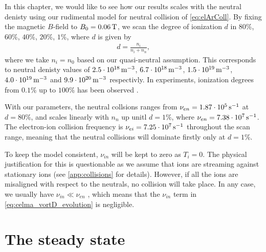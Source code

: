 In this chapter, we would like to see how our results scales with the neutral denisty using our rudimental model for neutral collision of \cref{eq:elArColl}.
By fixing the magnetic $B$-field to $B_0=0.06\, \text{T}$, we scan the degree of ionization $d$ in $80\%$, $60\%$, $40\%$, $20\%$, $1\%$, where $d$ is given by
%
\begin{align*}
    d = \frac{n_i}{n_i+n_n},
\end{align*}
%
where we take $n_i=n_0$ based on our quasi-neutral assumption.
This corresponds to neutral denisty values of
$2.5\cdot10^{18}\, \text{m}^{-3}$,
$6.7\cdot10^{18}\, \text{m}^{-3}$,
$1.5\cdot10^{19}\, \text{m}^{-3}$,
$4.0\cdot10^{19}\, \text{m}^{-3}$ and
$9.9\cdot10^{20}\, \text{m}^{-3}$
respectivly.
In experiments, ionization degrees from $0.1\%$ up to $100\%$ has been observed \cite{Schroder2003Phd}.

With our parameters, the neutral collsions ranges from $\nu_{en}=1.87\cdot10^{5}\, \text{s}^{-1}$ at $d=80\%$, and scales linearly with $n_n$ up unitl $d=1\%$, where $\nu_{en}=7.38\cdot10^7\, \text{s}^{-1}$.
The electron-ion collision frequency is $\nu_{ei}=7.25\cdot10^7 \, \text{s}^{-1}$ throughout the scan range, meaning that the neutral collisions will dominate firstly only at $d=1\%$.

To keep the model consistent, $\nu_{in}$ will be kept to zero as $T_i=0$.
The physical justification for this is questionable as we assume that ions are streaming against stationary ions (see \cref{app:collisions} for details).
However, if all the ions are misaligned with respect to the neutrals, no collision will take place.
In any case, we usually have $\nu_{in}\ll\nu_{en}$ \cite{Schroder2003Phd}, which means that the $\nu_{in}$ term in \cref{eq:celma_vortD_evolution} is negligible.

\section{The steady state}


